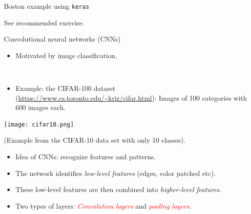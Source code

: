 \documentclass[
  10pt,
  ignorenonframetext,
]{beamer}
\providecommand{\tightlist}{%
  \setlength{\itemsep}{0pt}\setlength{\parskip}{0pt}}
\begin{document}
\begin{frame}[fragile]
\begin{block}{Boston example using \texttt{keras}}
\protect\hypertarget{boston-example-using-keras}{}
\(~\)

See recommended exercise.
\end{block}
\end{frame}

\begin{frame}{Convolutional neural networks (CNNs)}
\protect\hypertarget{convolutional-neural-networks-cnns}{}
\(~\)

\begin{itemize}
\tightlist
\item
  Motivated by image classification.
\end{itemize}

\(~\)

\begin{itemize}
\tightlist
\item
  Example: the CIFAR-100 dataset
  (\url{https://www.cs.toronto.edu/~kriz/cifar.html}): Images of 100
  categories with 600 images each.
\end{itemize}

\centering

\texttt{[image: cifar10.png]}

\flushleft
\scriptsize

(Example from the CIFAR-10 data set with only 10 classes).
\end{frame}

\begin{frame}
\vspace{2mm}

\begin{itemize}
\tightlist
\item
  Idea of CNNs: recognize features and patterns.
\end{itemize}

\vspace{2mm}

\begin{itemize}
\tightlist
\item
  The network identifies \emph{low-level features} (edges, color patched
  etc).
\end{itemize}

\vspace{2mm}

\begin{itemize}
\tightlist
\item
  These low-level features are then combined into \emph{higher-level
  features}.
\end{itemize}

\vspace{2mm}

\begin{itemize}
\tightlist
\item
  Two types of layers: \emph{\textcolor{red}{Convolution layers}} and
  \emph{\textcolor{red}{pooling layers}}.
\end{itemize}
\end{frame}
\end{document}

